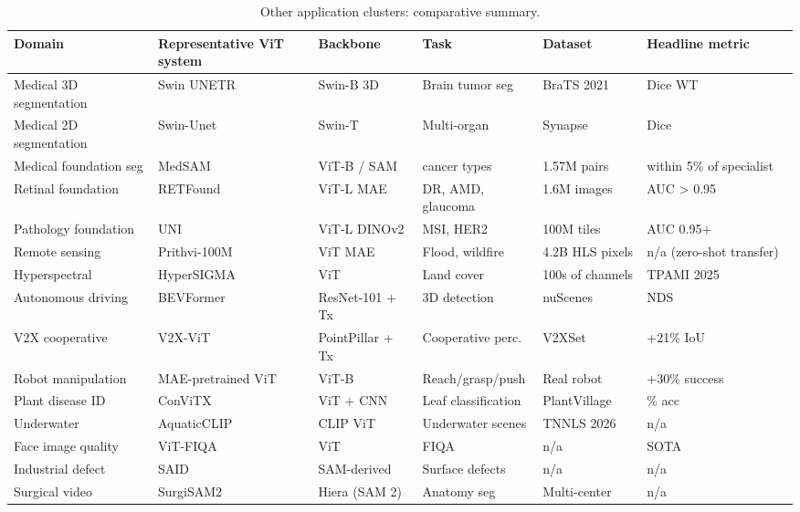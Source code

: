 \documentclass{article}
\begin{document}
\begin{table}[t]
\centering
\caption{Other application clusters: comparative summary.}
\label{tab:other-application-clusters}
\begin{tabular}{>{\raggedright\arraybackslash}p{0.1870\linewidth}
  >{\raggedright\arraybackslash}p{0.2033\linewidth}
  >{\raggedright\arraybackslash}p{0.1301\linewidth}
  >{\raggedright\arraybackslash}p{0.1545\linewidth}
  >{\raggedright\arraybackslash}p{0.1301\linewidth}
  >{\raggedright\arraybackslash}p{0.1951\linewidth}}
\toprule
Domain & Representative ViT system & Backbone & Task & Dataset & Headline metric \\
\midrule
Medical 3D segmentation & Swin UNETR & Swin-B 3D & Brain tumor seg & BraTS 2021 & 0.91 Dice WT \\
Medical 2D segmentation & Swin-Unet & Swin-T & Multi-organ & Synapse & 0.79 Dice \\
Medical foundation seg & MedSAM & ViT-B / SAM & 30 cancer types & 1.57M pairs & within 5\% of specialist \\
Retinal foundation & RETFound & ViT-L MAE & DR, AMD, glaucoma & 1.6M images & AUC \textgreater{} 0.95 \\
Pathology foundation & UNI & ViT-L DINOv2 & MSI, HER2 & 100M tiles & AUC 0.95+ \\
Remote sensing & Prithvi-100M & ViT MAE & Flood, wildfire & 4.2B HLS pixels & n/a (zero-shot transfer) \\
Hyperspectral & HyperSIGMA & ViT & Land cover & 100s of channels & TPAMI 2025 \\
Autonomous driving & BEVFormer & ResNet-101 + Tx & 3D detection & nuScenes & 51.7 NDS \\
V2X cooperative & V2X-ViT & PointPillar + Tx & Cooperative perc. & V2XSet & +21\% IoU \\
Robot manipulation & MAE-pretrained ViT & ViT-B & Reach/grasp/push & Real robot & +30\% success \\
Plant disease ID & ConViTX & ViT + CNN & Leaf classification & PlantVillage & 99.0\% acc \\
Underwater & AquaticCLIP & CLIP ViT & Underwater scenes & TNNLS 2026 & n/a \\
Face image quality & ViT-FIQA & ViT & FIQA & n/a & SOTA \\
Industrial defect & SAID & SAM-derived & Surface defects & n/a & n/a \\
Surgical video & SurgiSAM2 & Hiera (SAM 2) & Anatomy seg & Multi-center & n/a \\
\end{tabular}
\end{table}
\end{document}
